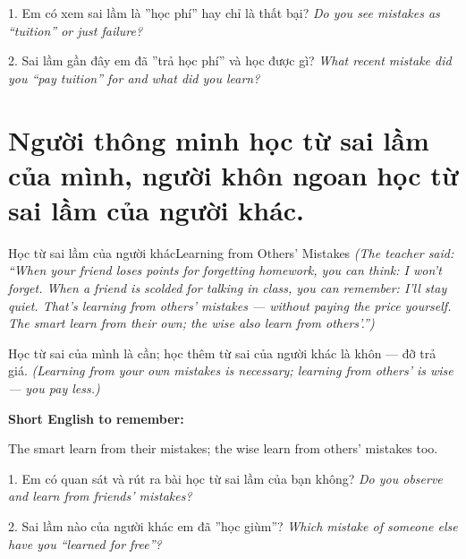 \begin{tuhocnhanh}
1. Em có xem sai lầm là ''học phí'' hay chỉ là thất bại? \textit{Do you see mistakes as ``tuition'' or just failure?}

2. Sai lầm gần đây em đã ''trả học phí'' và học được gì? \textit{What recent mistake did you ``pay tuition'' for and what did you learn?}
\end{tuhocnhanh}
\ngancach

\section{Người thông minh học từ sai lầm của mình, người khôn ngoan học từ sai lầm của người khác.}
\begin{truyen}{Học từ sai lầm của người khác}{Learning from Others' Mistakes}
\textit{(The teacher said: ``When your friend loses points for forgetting homework, you can think: I won't forget. When a friend is scolded for talking in class, you can remember: I'll stay quiet. That's learning from others' mistakes — without paying the price yourself. The smart learn from their own; the wise also learn from others'.'')}
\end{truyen}

\begin{baihoc}
Học từ sai của mình là cần; học thêm từ sai của người khác là khôn — đỡ trả giá.
\textit{(Learning from your own mistakes is necessary; learning from others' is wise — you pay less.)}
\end{baihoc}

\begin{ghinhoanh}
\textbf{Short English to remember:}

The smart learn from their mistakes; the wise learn from others' mistakes too.

\end{ghinhoanh}

\begin{tuhocnhanh}
1. Em có quan sát và rút ra bài học từ sai lầm của bạn không? \textit{Do you observe and learn from friends' mistakes?}

2. Sai lầm nào của người khác em đã ''học giùm''? \textit{Which mistake of someone else have you ``learned for free''?}
\end{tuhocnhanh}
\ngancach

